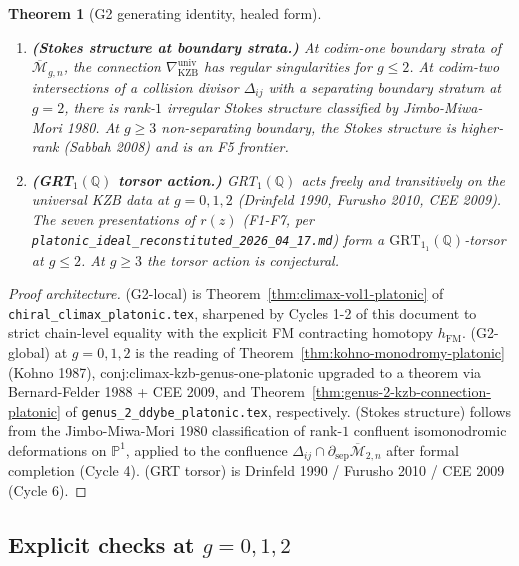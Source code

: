 \documentclass[12pt]{article}
\providecommand{\KZB}{\mathrm{KZB}}
\providecommand{\Mbar}{\overline{\mathcal{M}}}
\providecommand{\GRT}{\mathrm{GRT}_1}
\newtheorem{theorem}{Theorem}[section]
\theoremstyle{definition}
\begin{document}
\begin{theorem}[G2 generating identity, healed form]
\begin{enumerate}
\begin{enumerate}[label=\textup{(2-\roman*)}]
    non-separating boundary.
  \end{enumerate}
\item \textbf{(Stokes structure at boundary strata.)}
  At codim-one boundary strata of $\Mbar_{g,n}$, the
  connection $\nabla_{\KZB}^{\mathrm{univ}}$ has regular
  singularities for $g \leq 2$.  At codim-two intersections
  of a collision divisor $\Delta_{ij}$ with a separating
  boundary stratum at $g = 2$, there is rank-$1$ irregular
  Stokes structure classified by Jimbo-Miwa-Mori 1980.
  At $g \geq 3$ non-separating boundary, the Stokes structure
  is higher-rank (Sabbah 2008) and is an F5 frontier.
\item \textbf{(GRT$_1(\mathbb{Q})$ torsor action.)}
  GRT$_1(\mathbb{Q})$ acts freely and transitively on the
  universal KZB data at $g = 0, 1, 2$
  (Drinfeld 1990, Furusho 2010, CEE 2009).  The seven
  presentations of $r(z)$ (F1-F7, per
  \texttt{platonic\_ideal\_reconstituted\_2026\_04\_17.md})
  form a $\GRT_1(\mathbb{Q})$-torsor at $g \leq 2$.  At
  $g \geq 3$ the torsor action is conjectural.
\end{enumerate}
\end{theorem}

\begin{proof}[Proof architecture]
(G2-local) is Theorem~\ref{thm:climax-vol1-platonic} of
\texttt{chiral\_climax\_platonic.tex}, sharpened by Cycles 1-2
of this document to strict chain-level equality with the
explicit FM contracting homotopy $h_{\mathrm{FM}}$.
(G2-global) at $g = 0, 1, 2$ is the reading of
Theorem~\ref{thm:kohno-monodromy-platonic} (Kohno 1987),
conj:climax-kzb-genus-one-platonic
upgraded to a theorem via Bernard-Felder 1988 + CEE 2009,
and Theorem~\ref{thm:genus-2-kzb-connection-platonic} of
\texttt{genus\_2\_ddybe\_platonic.tex}, respectively.
(Stokes structure) follows from the Jimbo-Miwa-Mori 1980
classification of rank-$1$ confluent isomonodromic
deformations on $\mathbb{P}^1$, applied to the confluence
$\Delta_{ij} \cap \partial_{\mathrm{sep}}\Mbar_{2,n}$ after
formal completion (Cycle 4).
(GRT torsor) is Drinfeld 1990 / Furusho 2010 / CEE 2009
(Cycle 6).
\end{proof}

\subsection{Explicit checks at $g = 0, 1, 2$}
\label{ssec:G2-explicit-checks}
\end{document}
